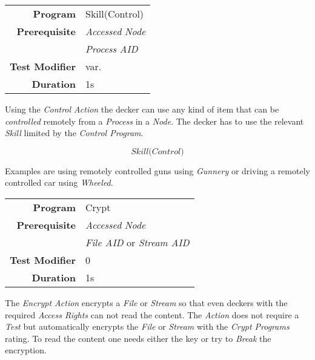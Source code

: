 \label{par:control}

\begin{tabular}{rl}
    \textbf{Program}       & Skill(Control)              \\
    \textbf{Prerequisite}  & \emph{Accessed} \emph{Node} \\
                           & \emph{Process} \emph{AID}   \\
    \textbf{Test Modifier} & var.                        \\
    \textbf{Duration}      & 1s                          \\
\end{tabular}

\hfill

Using the \emph{Control Action} the decker can use any kind of item that can be
\emph{controlled} remotely from a \emph{Process} in a \emph{Node}. The decker has
to use the relevant \emph{Skill} limited by the \emph{Control Program}.

\begin{equation*}
    \textit{Skill(Control)}
\end{equation*}

Examples are using remotely controlled guns using \emph{Gunnery} or driving a
remotely controlled car using \emph{Wheeled}.

\label{par:encrypt}

\begin{tabular}{rl}
    \textbf{Program}       & Crypt                                \\
    \textbf{Prerequisite}  & \emph{Accessed} \emph{Node}          \\
                           & \emph{File AID} or \emph{Stream AID} \\
    \textbf{Test Modifier} & 0                                    \\
    \textbf{Duration}      & 1s                                   \\
\end{tabular}

\hfill

The \emph{Encrypt Action} encrypts a \emph{File} or \emph{Stream} so that even
deckers with the required \emph{Access Rights} can not read the content. The
\emph{Action} does not require a \emph{Test} but automatically encrypts the
\emph{File} or \emph{Stream} with the \emph{Crypt Programs} rating.
To read the content one needs either the key or try to \emph{Break} the encryption.


